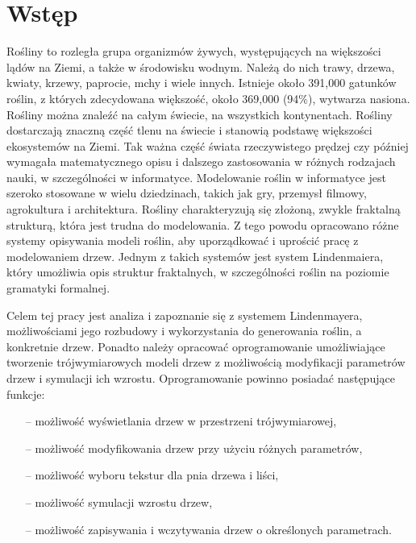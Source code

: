 \documentclass[a4paper,12pt,oneside]{book} %
\begin{document}
\sloppy
\thispagestyle{empty}

\newpage{}

\thispagestyle{empty}
\newpage{}

\tableofcontents{}

\chapter*{Wstęp} 

Rośliny to rozległa grupa organizmów żywych, występujących na większości 
lądów na Ziemi, a także w środowisku wodnym. 
Należą do nich trawy, drzewa, kwiaty, krzewy, paprocie, mchy i wiele innych.
Istnieje około 391,000 gatunków roślin, z których zdecydowana większość,
około 369,000 (94\%), wytwarza nasiona.\cite{howmanyplants} Rośliny można znaleźć na 
całym świecie, na wszystkich kontynentach. Rośliny dostarczają znaczną część 
tlenu na świecie i stanowią podstawę
większości ekosystemów na Ziemi. Tak ważna część świata rzeczywistego prędzej 
czy później wymagała matematycznego opisu i dalszego zastosowania w różnych rodzajach nauki, w
szczególności w informatyce. Modelowanie roślin w informatyce
jest szeroko stosowane w wielu dziedzinach, takich jak gry, przemysł filmowy, 
agrokultura i architektura. Rośliny charakteryzują się złożoną,
zwykle fraktalną strukturą, która jest trudna do modelowania.
Z tego powodu opracowano różne systemy opisywania modeli roślin,
aby uporządkować i uprościć pracę z modelowaniem drzew. Jednym z
takich systemów jest system Lindenmaiera, który umożliwia opis struktur 
fraktalnych, w szczególności roślin na poziomie gramatyki formalnej.




Celem tej pracy jest analiza i zapoznanie się z systemem Lindenmayera, 
możliwościami jego rozbudowy i wykorzystania do generowania roślin, 
a konkretnie drzew. Ponadto należy opracować oprogramowanie umożliwiające 
tworzenie trójwymiarowych modeli drzew z możliwością modyfikacji 
parametrów drzew i symulacji ich wzrostu. Oprogramowanie powinno posiadać 
następujące funkcje:

\begin{itemize}

\item[--] możliwość wyświetlania drzew w przestrzeni trójwymiarowej,
\item[--] możliwość modyfikowania drzew przy użyciu różnych parametrów,
\item[--] możliwość wyboru tekstur dla pnia drzewa i liści,
\item[--] możliwość symulacji wzrostu drzew,
\item[--] możliwość zapisywania i wczytywania drzew o określonych parametrach.

\end{itemize}
\end{document}
